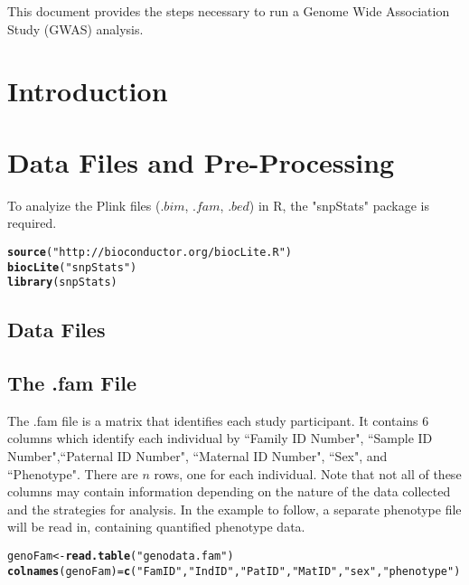 \documentclass[11pt]{article}\usepackage[]{graphicx}\usepackage[]{color}
\makeatletter
\newcommand{\hlstr}[1]{\textcolor[rgb]{0.192,0.494,0.8}{#1}}%
\newcommand{\hlstd}[1]{\textcolor[rgb]{0.345,0.345,0.345}{#1}}%
\newcommand{\hlkwb}[1]{\textcolor[rgb]{0.69,0.353,0.396}{#1}}%
\newcommand{\hlkwd}[1]{\textcolor[rgb]{0.737,0.353,0.396}{\textbf{#1}}}%
\newenvironment{kframe}{%
 \def\at@end@of@kframe{}%
 \ifinner\ifhmode%
  \def\at@end@of@kframe{\end{minipage}}%
  \begin{minipage}{\columnwidth}%
 \fi\fi%
 \def\FrameCommand##1{\hskip\@totalleftmargin \hskip-\fboxsep
 \colorbox{shadecolor}{##1}\hskip-\fboxsep
     \hskip-\linewidth \hskip-\@totalleftmargin \hskip\columnwidth}%
 \MakeFramed {\advance\hsize-\width
   \@totalleftmargin\z@ \linewidth\hsize
   \@setminipage}}%
 {\par\unskip\endMakeFramed%
 \at@end@of@kframe}
\newenvironment{knitrout}{}{} %
\makeatother
\begin{document}
This document provides the steps necessary to run a Genome Wide Association Study (GWAS) analysis.
\section{Introduction}
\section{Data Files and Pre-Processing}

To analyize the Plink files ($.bim$, $.fam$, $.bed$) in R, the "snpStats" package is required.

\begin{knitrout}
\color{fgcolor}\begin{kframe}
\begin{alltt}
\hlkwd{source}\hlstd{(}\hlstr{"http://bioconductor.org/biocLite.R"}\hlstd{)}
\hlkwd{biocLite}\hlstd{(}\hlstr{"snpStats"}\hlstd{)}
\hlkwd{library}\hlstd{(snpStats)}
\end{alltt}
\end{kframe}
\end{knitrout}

\subsection{Data Files}
\subsection*{The .fam File}
The .fam file is a matrix that identifies each study participant. It contains 6 columns which identify each individual by ``Family ID Number", ``Sample ID Number",``Paternal ID Number", ``Maternal ID Number", ``Sex", and ``Phenotype".  There are $n$ rows, one for each individual. Note that not all of these columns may contain information depending on the nature of the data collected and the strategies for analysis. In the example to follow, a separate phenotype file will be read in, containing quantified phenotype data.
\begin{knitrout}
\color{fgcolor}\begin{kframe}
\begin{alltt}
\hlstd{genoFam} \hlkwb{<-} \hlkwd{read.table}\hlstd{(}\hlstr{"genodata.fam"}\hlstd{)}
\hlkwd{colnames}\hlstd{(genoFam)} \hlkwb{=} \hlkwd{c}\hlstd{(}\hlstr{"FamID"}\hlstd{,} \hlstr{"IndID"}\hlstd{,} \hlstr{"PatID"}\hlstd{,} \hlstr{"MatID"}\hlstd{,} \hlstr{"sex"}\hlstd{,} \hlstr{"phenotype"}\hlstd{)}
\end{alltt}
\end{kframe}
\end{knitrout}
\end{document}

